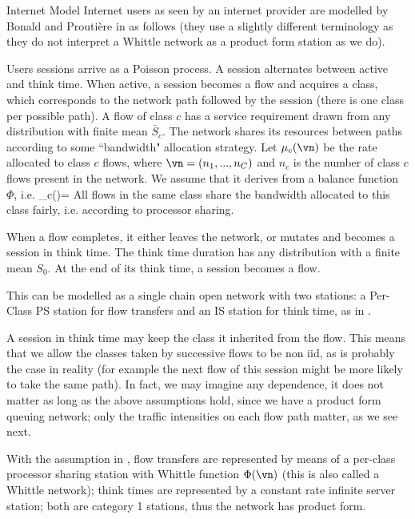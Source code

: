 \begin{ex}{Internet Model \cite{bonald2003insensitive}}
Internet users as seen by an internet provider
are modelled by Bonald and Prouti\`{e}re in
\cite{bonald2003insensitive} as follows (they use
a slightly different terminology as they do not
interpret a Whittle network as a product form
station as we do).

Users sessions arrive as a Poisson process. A
session alternates between active and think time.
When active, a session becomes a flow and
acquires a class, which corresponds to the
network path followed by the session (there is
one class per possible path). A flow of class $c$
has a service requirement drawn from any
distribution with finite mean $\bar{S}_c$. The
network shares its resources between paths
according to some ``bandwidth" allocation
strategy. Let $\mu_c(\vn)$ be the rate allocated
to class $c$ flows, where $\vn=(n_1, ..., n_C)$
and $n_c$ is the number of class $c$ flows
present in the network. We assume that it derives
from a balance function $\Phi$, i.e.
  \be
 \mu_c(\vn)=
 \label{eq-q-qnet-bon-aal}
 \ee
All flows in the same
class share the bandwidth allocated to this class
fairly, i.e. according to processor sharing.

When a flow completes, it either leaves the
network, or mutates and becomes a session in
think time. The think time duration has any
distribution with a finite mean $S_0$. At the end
of its think time, a session becomes a flow.

This can be modelled as a single chain open
network with two stations: a Per-Class PS station
for flow transfers and an IS station for think
time, as in .

A session in think time may keep the class it
inherited from the flow. This means that we allow
the classes taken by successive flows to be non
iid, as is probably the case in reality (for
example the next flow of this session might be
more likely to take the same path). In fact, we
may imagine any dependence, it does not matter as
long as the above assumptions hold, since we have
a product form queuing network; only the traffic
intensities on each flow path matter, as we see
next.

With the assumption in ,
flow transfers are represented by means of a
per-class processor sharing station with Whittle
function $\Phi(\vn)$ (this is also called a
Whittle network); think times are represented by
a constant rate infinite server station; both are
category 1 stations, thus the network has product
form.


\end{ex}
